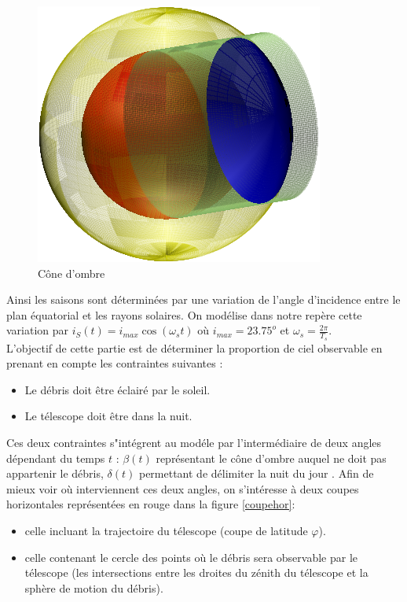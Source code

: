\documentclass[a4paper,11pt]{article}
\numberwithin{section}{part}
\begin{document}
 \begin{figure}[h]\label{ombre}
    \centering
    \includegraphics[width=.6\textwidth]{figures/ombre.pdf}
    \caption{C\^one d'ombre}
 \end{figure}
 
\vspace{0.5cm} Ainsi les saisons sont d\'etermin\'ees par une variation de l'angle d'incidence entre le plan \'equatorial et les rayons solaires.
On mod\'elise dans notre rep\`ere cette variation par $i_{S}(t)= i_{max}\cos(\omega_{s}t)$ o\`u $i_{max}=23.75^o$ et $\displaystyle{\omega_s=\frac{2\pi}{T_s}}$. \\
 
L'objectif de cette partie est de d\'eterminer la proportion de ciel observable en prenant en compte les contraintes suivantes : 

\begin{itemize}
\item Le d\'ebris doit \^etre \'eclair\'e par le soleil. 
\item Le t\'elescope doit \^etre dans la nuit.
\end{itemize}

\vspace{0.5cm}

Ces deux contraintes s"int\'egrent au mod\'ele par l'interm\'ediaire de deux angles d\'ependant du temps $t$ : $\beta(t)$ repr\'esentant le c\^one d'ombre auquel ne doit pas appartenir le d\'ebris, $\delta(t)$ permettant de d\'elimiter la nuit du jour . Afin de mieux voir o\`u interviennent ces deux angles, on s'int\'eresse \`a deux coupes horizontales repr\'esent\'ees en rouge dans la figure \ref{coupehor}:
\begin{itemize}
\item celle incluant la trajectoire du t\'elescope (coupe de latitude $\varphi$).
\item celle contenant le cercle des points o\`u le d\'ebris sera observable par le t\'elescope (les intersections entre les droites du z\'enith du t\'elescope et la sph\`ere de motion du d\'ebris).
\end{itemize}
\end{document}
